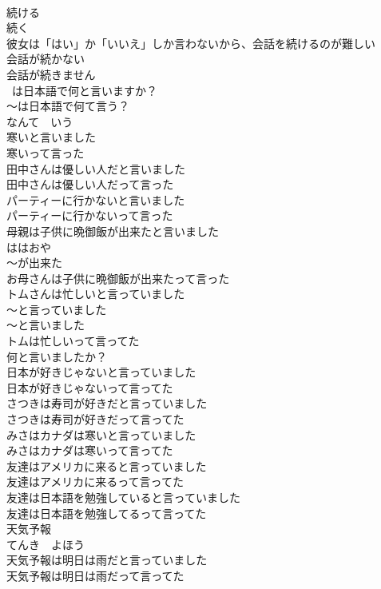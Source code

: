 \documentclass[8pt]{extreport}
\begin{document}
\begin{CJK}{UTF8}{min}
\\	続ける 
\\	続く 
\\	彼女は「はい」か「いいえ」しか言わないから、会話を続けるのが難しい	
\\	会話が続かない	
\\	会話が続きません	
\\	~は日本語で何と言いますか？	
\\	～は日本語で何て言う？	
\\	なんて　いう
\\	寒いと言いました	
\\	寒いって言った	
\\	田中さんは優しい人だと言いました	
\\	田中さんは優しい人だって言った	
\\	パーティーに行かないと言いました	
\\	パーティーに行かないって言った	
\\	母親は子供に晩御飯が出来たと言いました	
\\	ははおや
\\	～が出来た 
\\	お母さんは子供に晩御飯が出来たって言った	
\\	トムさんは忙しいと言っていました	
\\	～と言っていました 
\\	～と言いました 
\\	トムは忙しいって言ってた	
\\	何と言いましたか？	
\\	日本が好きじゃないと言っていました	
\\	日本が好きじゃないって言ってた	
\\	さつきは寿司が好きだと言っていました	
\\	さつきは寿司が好きだって言ってた	
\\	みさはカナダは寒いと言っていました	
\\	みさはカナダは寒いって言ってた	
\\	友達はアメリカに来ると言っていました	
\\	友達はアメリカに来るって言ってた	
\\	友達は日本語を勉強していると言っていました	
\\	友達は日本語を勉強してるって言ってた	
\\	天気予報	
\\	てんき　よほう
\\	天気予報は明日は雨だと言っていました	
\\	天気予報は明日は雨だって言ってた	

\end{CJK}
\end{document}

